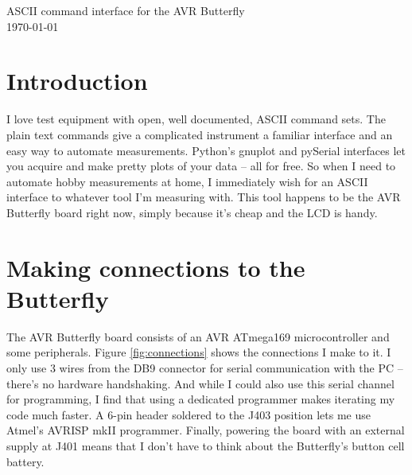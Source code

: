 
\graphicspath{
              {figs/} %
              {pngs/} %
}

\newcommand{\isdraft}{1} %
\doublespacing{} %






\begin{center}
	{\huge ASCII command interface for the AVR Butterfly}\\
	\today
\end{center}



\section{Introduction}
I love test equipment with open, well documented, ASCII command sets.  The plain text commands give a complicated instrument a familiar interface and an easy way to automate measurements.  Python's gnuplot and pySerial interfaces let you acquire and make pretty plots of your data -- all for free\cite{pyserial,gnuplot-py}. So when I need to automate hobby measurements at home, I immediately wish for an ASCII interface to whatever tool I'm measuring with.  This tool happens to be the AVR Butterfly board right now, simply because it's cheap and the LCD is handy.  

\clearpage
\section{Making connections to the Butterfly}
The AVR Butterfly board consists of an AVR ATmega169 microcontroller and some peripherals.  Figure \ref{fig:connections} shows the connections I make to it.  I only use 3 wires from the DB9 connector for serial communication with the PC -- there's no hardware handshaking.  And while I could also use this serial channel for programming, I find that using a dedicated programmer makes iterating my code much faster.  A 6-pin header soldered to the J403 position lets me use Atmel's AVRISP mkII programmer.  Finally, powering the board with an external supply at J401 means that I don't have to think about the Butterfly's button cell battery.  

